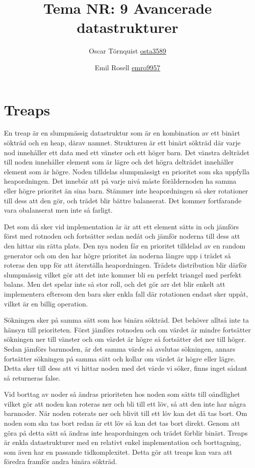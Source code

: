\documentclass[a5paper,10pt,oneside]{article}
\title{Tema NR: 9 Avancerade datastrukturer}
\author{Oscar Törnquist \url{osta3589} \and Emil Rosell \url{emro9957}}
\begin{document}
\maketitle

\section*{Treaps}

En treap är en slumpmässig datastruktur som är en kombination av ett binärt sökträd och en heap, därav namnet. Strukturen är ett binärt sökträd där varje nod innehåller ett data med ett vänster och ett höger barn. Det vänstra delträdet till noden innehåller element som är lägre och det högra delträdet innehåller element som är högre. Noden tilldelas slumpmässigt en prioritet som ska uppfylla heapordningen. Det innebär att på varje nivå måste föräldernoden ha samma eller högre prioritet än sina barn. Stämmer inte heapordningen så sker rotationer till dess att den gör, och trädet blir bättre balanserat. Det kommer fortfarande vara obalanserat men inte så farligt. 

Det som då sker vid implementation är är att ett element sätts in och jämförs först med rotnoden och fortsätter sedan nedåt och jämför noderna till dess att den hittar sin rätta plats. Den nya noden får en prioritet tilldelad av en random generator och om den har högre prioritet än noderna längre upp i trädet så roteras den upp för att återställa heapordningen. Trädets distribution blir därför slumpmässig vilket gör att det inte kommer bli en perfekt triangel med perfekt balans. Men det spelar inte så stor roll, och det gör arr det blir enkelt att implementera eftersom den bara sker enkla fall där rotationen endast sker uppåt, vilket är en billig operation. 

Sökningen sker på samma sätt som hos binära sökträd. Det behöver alltså inte ta hänsyn till prioriteten. Först jämförs rotnoden och om värdet är mindre fortsätter sökningen ner till vänster och om värdet är högre så fortsätter det ner till höger. Sedan jämförs barnnoden, är det samma värde så avslutas sökningen, annars fortsätter sökningen på samma sätt och kollar om värdet är högre eller lägre. Detta sker till dess att vi hittar noden med det värde vi söker, finns inget sådant så returneras false.

Vid borttag av noder så ändras prioriteten hos noden som sätts till oändlighet vilket gör att noden kan roteras ner och bli till ett löv, så att den inte har några barnnoder. När noden roterats ner och blivit till ett löv kan det då tas bort. Om noden som ska tas bort redan är ett löv så kan det tas bort direkt. Genom att göra på detta sätt så ändras inte heapordningen och trädet förblir binärt. Treaps är enkla datastrukturer med en relativt enkel implementation och borttagning, som även har en passande tidkomplexitet. Detta gör att treaps kan vara att föredra framför andra binära sökträd.  
\end{document}
